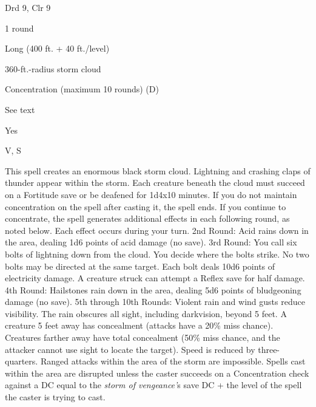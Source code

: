 
\begin{description*}
\item[Level:] Drd 9, Clr 9
\item[Casting Time:] 1 round
\item[Range:] Long (400 ft. + 40 ft./level)
\item[Effect:] 360-ft.-radius storm cloud
\item[Duration:] Concentration (maximum 10 rounds) (D)
\item[Saving Throw:] See text
\item[Spell Resistance:] Yes
\item[Components:] V, S
\end{description*}

This spell creates an enormous black storm cloud. Lightning and crashing claps
of thunder appear within the storm. Each creature beneath the cloud must succeed
on a Fortitude save or be deafened for 1d4x10 minutes.
If you do not maintain concentration on the spell after casting it, the spell ends.
If you continue to concentrate, the spell generates additional effects in each
following round, as noted below. Each effect occurs during your turn.
2nd Round: Acid rains down in the area, dealing 1d6 points of acid damage
(no save).
3rd Round: You call six bolts of lightning down from the cloud. You decide
where the bolts strike. No two bolts may be directed at the same target. Each bolt
deals 10d6 points of electricity damage. A creature struck can attempt a Reflex
save for half damage.
4th Round: Hailstones rain down in the area, dealing 5d6 points of bludgeoning
damage (no save).
5th through 10th Rounds: Violent rain and wind gusts reduce visibility.
The rain obscures all sight, including darkvision, beyond 5 feet. A creature 5
feet away has concealment (attacks have a 20\% miss chance). Creatures farther
away have total concealment (50\% miss chance, and the attacker cannot use sight
to locate the target). Speed is reduced by three-quarters.
Ranged attacks within the area of the storm are impossible. Spells cast within
the area are disrupted unless the caster succeeds on a Concentration check against
a DC equal to the \textit{storm of vengeance'}s save DC + the level of the spell
the caster is trying to cast.